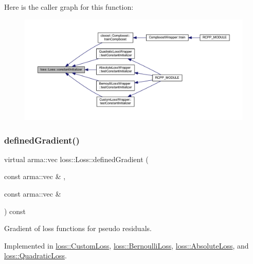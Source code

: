 Here is the caller graph for this function\+:\nopagebreak
\begin{figure}[H]
\begin{center}
\leavevmode
\includegraphics[width=350pt]{classloss_1_1_loss_a65fe7dcd9370e6a549b8d1cc95fc8798_icgraph}
\end{center}
\end{figure}
\mbox{\label{classloss_1_1_loss_a267a4de70747ade4b2d84ce35a448979}} 
\subsubsection{\texorpdfstring{defined\+Gradient()}{definedGradient()}}
{\footnotesize\ttfamily virtual arma\+::vec loss\+::\+Loss\+::defined\+Gradient (\begin{DoxyParamCaption}\item[{const arma\+::vec \&}]{,  }\item[{const arma\+::vec \&}]{ }\end{DoxyParamCaption}) const\hspace{0.3cm}{\ttfamily [pure virtual]}}



Gradient of loss functions for pseudo residuals. 



Implemented in \mbox{\hyperlink{classloss_1_1_custom_loss_a3a79dc019e781c2956b52fb8e1cfcc56}{loss\+::\+Custom\+Loss}}, \mbox{\hyperlink{classloss_1_1_bernoulli_loss_a2dc644172cea3eb84f1af5aa9217c04a}{loss\+::\+Bernoulli\+Loss}}, \mbox{\hyperlink{classloss_1_1_absolute_loss_a1886fc8ca065c6f0a207b7a8a0f8444d}{loss\+::\+Absolute\+Loss}}, and \mbox{\hyperlink{classloss_1_1_quadratic_loss_adb4da1acbad702b5ba8570abaa17d373}{loss\+::\+Quadratic\+Loss}}.

